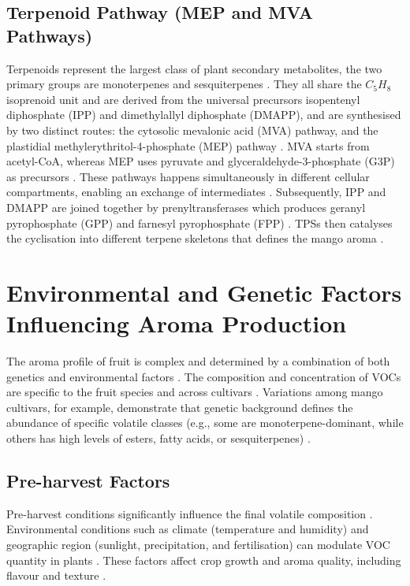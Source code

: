 \subsection{Terpenoid Pathway (MEP and MVA Pathways)}
Terpenoids represent the largest class of plant secondary metabolites, the two primary groups are monoterpenes and sesquiterpenes \cite*{A04_GUO2023112779, A02_Moreno2010, A09_Barras2024}. They all share the $C_5H_8$ isoprenoid unit and are derived from the universal precursors isopentenyl diphosphate (IPP) and dimethylallyl diphosphate (DMAPP), and are synthesised by two distinct routes: the cytosolic mevalonic acid (MVA) pathway, and the plastidial methylerythritol-4-phosphate (MEP) pathway \cite*{A09_Barras2024,A13_ElHadi2013}. MVA starts from acetyl-CoA, whereas MEP uses pyruvate and glyceraldehyde-3-phosphate (G3P) as precursors \cite*{A09_Barras2024}. These pathways happens simultaneously in different cellular compartments, enabling an exchange of intermediates \cite*{A09_Barras2024}. Subsequently, IPP and DMAPP are joined together by prenyltransferases which produces geranyl pyrophosphate (GPP) and farnesyl pyrophosphate (FPP) \cite*{A09_Barras2024,A13_ElHadi2013}. TPSs then catalyses the cyclisation into different terpene skeletons that defines the mango aroma \cite*{A09_Barras2024,A13_ElHadi2013}.


\section{Environmental and Genetic Factors Influencing Aroma Production}
The aroma profile of fruit is complex and determined by a combination of both genetics and environmental factors \cite*{A13_ElHadi2013,A16_Tandel2023}. The composition and concentration of VOCs are specific to the fruit species and across cultivars \cite*{A13_ElHadi2013,A16_Tandel2023}. Variations among mango cultivars, for example, demonstrate that genetic background defines the abundance of specific volatile classes (e.g., some are monoterpene-dominant, while others has high levels of esters, fatty acids, or sesquiterpenes) \cite*{A16_Tandel2023}.


\subsection{Pre-harvest Factors}
Pre-harvest conditions significantly influence the final volatile composition \cite*{A13_ElHadi2013}. Environmental conditions such as climate (temperature and humidity) and geographic region (sunlight, precipitation, and fertilisation) can modulate VOC quantity in plants \cite*{A01_Aguirre-Lopez_2023,A16_Tandel2023}. These factors affect crop growth and aroma quality, including flavour and texture \cite*{A13_ElHadi2013}. 



